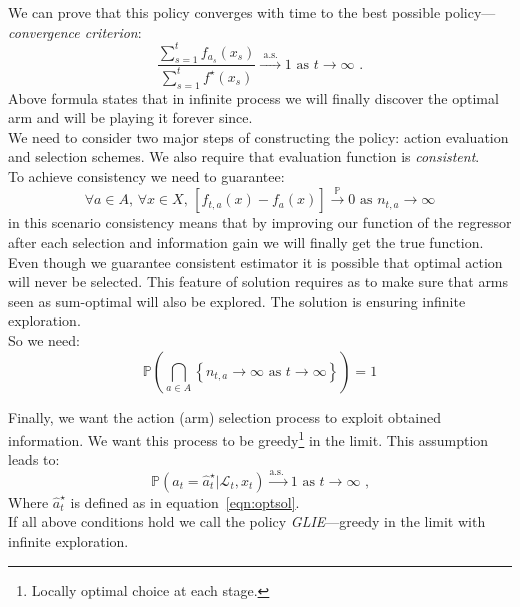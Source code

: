 \documentclass[12pt, a4paper, pdflatex, leqno]{report}
\begin{document}
We can prove that this policy converges with time to the best possible policy---\emph{convergence criterion}:
\begin{equation}
  \label{eqn:convg}
  \frac
    {\sum_{s=1}^t f_{a_s} (x_s)}
    {\sum_{s=1}^t f^\star (x_s)}
  \xrightarrow{\text{ a.s.\ }} 1 \text{ as } t \rightarrow \infty \text{ .}
\end{equation}
Above formula states that in infinite process we will finally discover the optimal arm and will be playing it forever since.\\


We need to consider two major steps of constructing the policy: action evaluation and selection schemes. We also require that evaluation function is \emph{consistent}.\\

To achieve consistency we need to guarantee:
$$
  \forall a \in A \text{, } \forall x \in X \text{, } \left[ \hat{f}_{t, a}(x) - f_a(x) \right] \xrightarrow{\mathbb{P}} 0 \text{ as } n_{t,a} \rightarrow \infty
$$
in this scenario consistency means that by improving our function of the regressor after each selection and information gain we will finally get the true function.\\

Even though we guarantee consistent estimator it is possible that optimal action will never be selected. This feature of solution requires as to make sure that arms seen as sum-optimal will also be explored. The solution is ensuring infinite exploration.\\

So we need:
$$
  \mathbb{P} \left( \bigcap_{a \in A} \left\{ n_{t,a} \rightarrow \infty \text{ as } t \rightarrow \infty \right\} \right) = 1
$$

Finally, we want the action (arm) selection process to exploit obtained information. We want this process to be greedy\footnote{Locally optimal choice at each stage.} in the limit. This assumption leads to:\\
$$
  \mathbb{P} \left( a_t = \hat{a}_t^\star | \mathscr{L}_t, x_t \right) \xrightarrow{\text{a.s.\ }} 1 \text{ as } t \rightarrow \infty \text{ ,}
$$
Where $\hat{a}_t^\star$ is defined as in equation~\ref{eqn:optsol}.\\

If all above conditions hold we call the policy \emph{GLIE}---greedy in the limit with infinite exploration.\\
\end{document}
